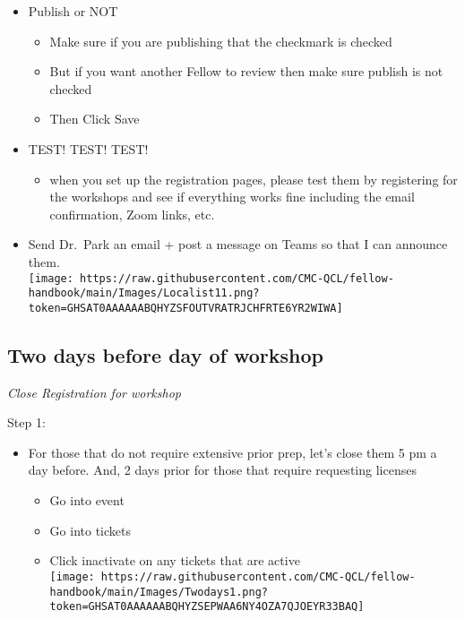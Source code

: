 \documentclass[
]{book}
\providecommand{\tightlist}{%
  \setlength{\itemsep}{0pt}\setlength{\parskip}{0pt}}
\begin{document}
\begin{itemize}
\tightlist
\item
  Publish or NOT

  \begin{itemize}
  \tightlist
  \item
    Make sure if you are publishing that the checkmark is checked\\
  \item
    But if you want another Fellow to review then make sure publish is not checked\\
  \item
    Then Click Save\\
  \end{itemize}
\item
  TEST! TEST! TEST!

  \begin{itemize}
  \tightlist
  \item
    when you set up the registration pages, please test them by registering for the workshops and see if everything works fine including the email confirmation, Zoom links, etc.\\
  \end{itemize}
\item
  Send Dr.~Park an email + post a message on Teams so that I can announce them.\\
  \texttt{[image: https://raw.githubusercontent.com/CMC-QCL/fellow-handbook/main/Images/Localist11.png?token=GHSAT0AAAAAABQHYZSFOUTVRATRJCHFRTE6YR2WIWA]}
\end{itemize}

\hypertarget{two-days-before-day-of-workshop}{%
\subsection{Two days before day of workshop}\label{two-days-before-day-of-workshop}}

\emph{Close Registration for workshop}

Step 1:

\begin{itemize}
\tightlist
\item
  For those that do not require extensive prior prep, let's close them 5 pm a day before. And, 2 days prior for those that require requesting licenses

  \begin{itemize}
  \tightlist
  \item
    Go into event\\
  \item
    Go into tickets\\
  \item
    Click inactivate on any tickets that are active\\
    \texttt{[image: https://raw.githubusercontent.com/CMC-QCL/fellow-handbook/main/Images/Twodays1.png?token=GHSAT0AAAAAABQHYZSEPWAA6NY4OZA7QJOEYR33BAQ]}
  \end{itemize}
\end{itemize}
\end{document}
